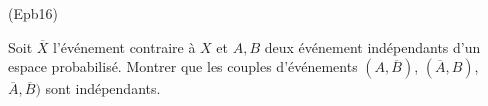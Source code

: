 \begin{tiny}(Epb16)\end{tiny} Soit $\overline{X}$ l'événement contraire à $X$ et $A, B$ deux événement indépendants d'un espace probabilisé. Montrer que les couples d'événements $(A,\overline{B})$, $(\overline{A},B)$, $\overline{A},\overline{B})$ sont indépendants.  